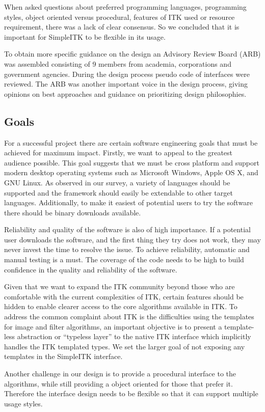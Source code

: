 \documentclass{frontiersMED} %
\begin{document}
When asked questions about preferred programming languages,
programming styles, object oriented versus procedural, features of ITK
used or resource requirement, there was a lack of clear consensus. So
we concluded that it is important for SimpleITK to be flexible in its
usage.

To obtain more specific guidance on the design an Advisory Review
Board (ARB) was assembled consisting of 9 members from academia,
corporations and government agencies. During the design process pseudo
code of interfaces were reviewed. The ARB was another important voice
in the design process, giving opinions on best approaches and guidance
on prioritizing design philosophies.

\subsection{Goals}
For a successful project there are certain software engineering goals
that must be achieved for maximum impact. Firstly, we want to appeal
to the greatest audience possible. This goal suggests that we must be
cross platform and support modern desktop operating systems such as
Microsoft Windows, Apple OS X, and GNU Linux. As observed in our
survey, a variety of languages should be supported and the framework
should easily be extendable to other target languages. Additionally,
to make it easiest of potential users to try the software there should
be binary downloads available.

Reliability and quality of the software is also of high importance. If
a potential user downloads the software, and the first thing they try
does not work, they may never invest the time to resolve the issue. To
achieve reliability, automatic and manual testing is a must. The
coverage of the code needs to be high to build confidence in the
quality and reliability of the software.

Given that we want to expand the ITK community beyond those who are
comfortable with the current complexities of ITK, certain features
should be hidden to enable clearer access to the core algorithms
available in ITK. To address the common complaint about ITK is the
difficulties using the templates for image and filter algorithms, an
important objective is to present a template-less abstraction  or
“typeless layer” to the native ITK interface which implicitly handles
the ITK templated types. We set the larger goal of not exposing any
templates in the SimpleITK interface.

Another challenge in our design is to provide a procedural interface
to the algorithms, while still providing a object oriented for those
that prefer it. Therefore the interface design needs to be flexible so
that it can support multiple usage styles.
\end{document}
